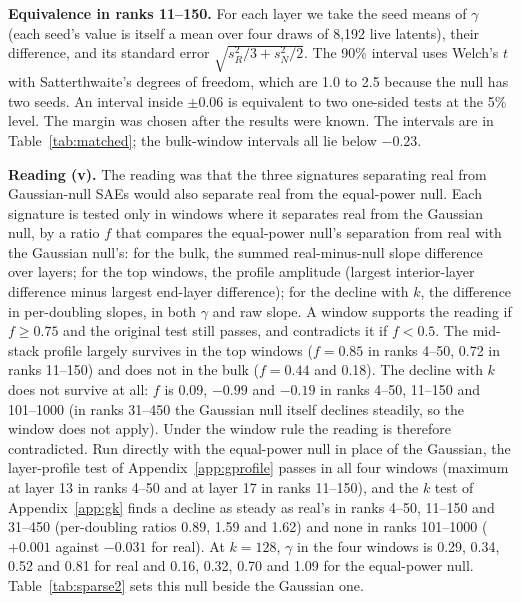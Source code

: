 \documentclass[10pt,twocolumn]{article}
\begin{document}
\textbf{Equivalence in ranks 11--150.} For each layer we take the seed means of $\gamma$ (each seed's value is itself a mean over four draws of 8,192 live latents), their difference, and its standard error $\sqrt{s_R^2/3 + s_N^2/2}$. The 90\% interval uses Welch's $t$ with Satterthwaite's degrees of freedom, which are 1.0 to 2.5 because the null has two seeds. An interval inside $\pm 0.06$ is equivalent to two one-sided tests at the 5\% level. The margin was chosen after the results were known. The intervals are in Table~\ref{tab:matched}; the bulk-window intervals all lie below $-0.23$.

\textbf{Reading (v).} The reading was that the three signatures separating real from Gaussian-null SAEs would also separate real from the equal-power null. Each signature is tested only in windows where it separates real from the Gaussian null, by a ratio $f$ that compares the equal-power null's separation from real with the Gaussian null's: for the bulk, the summed real-minus-null slope difference over layers; for the top windows, the profile amplitude (largest interior-layer difference minus largest end-layer difference); for the decline with $k$, the difference in per-doubling slopes, in both $\gamma$ and raw slope. A window supports the reading if $f \ge 0.75$ and the original test still passes, and contradicts it if $f<0.5$. The mid-stack profile largely survives in the top windows ($f=0.85$ in ranks 4--50, 0.72 in ranks 11--150) and does not in the bulk ($f=0.44$ and 0.18). The decline with $k$ does not survive at all: $f$ is 0.09, $-0.99$ and $-0.19$ in ranks 4--50, 11--150 and 101--1000 (in ranks 31--450 the Gaussian null itself declines steadily, so the window does not apply). Under the window rule the reading is therefore contradicted. Run directly with the equal-power null in place of the Gaussian, the layer-profile test of Appendix~\ref{app:gprofile} passes in all four windows (maximum at layer 13 in ranks 4--50 and at layer 17 in ranks 11--150), and the $k$ test of Appendix~\ref{app:gk} finds a decline as steady as real's in ranks 4--50, 11--150 and 31--450 (per-doubling ratios 0.89, 1.59 and 1.62) and none in ranks 101--1000 ($+0.001$ against $-0.031$ for real). At $k=128$, $\gamma$ in the four windows is 0.29, 0.34, 0.52 and 0.81 for real and 0.16, 0.32, 0.70 and 1.09 for the equal-power null. Table~\ref{tab:sparse2} sets this null beside the Gaussian one.

\begin{table}[!htb]
\centering
\caption{Real, sparse-null and Gaussian-null SAEs at eight layers of Gemma-2-2B ($k=40$, width 16,384; real and Gaussian three seeds, sparse null two). Seed sd of the sparse null's $\gamma$ is at most 0.026.}
\label{tab:sparse2}
\small

\end{table}
\end{document}

